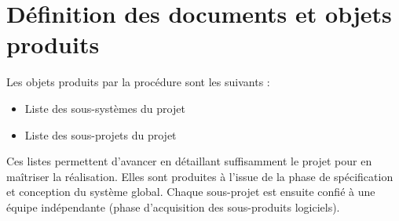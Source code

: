 \section{Définition des documents et objets produits}

Les objets produits par la procédure sont les suivants :

\begin{itemize}
\item Liste des sous-systèmes du projet
\item Liste des sous-projets du projet
\end{itemize}

Ces listes permettent d'avancer en détaillant suffisamment le projet pour en maîtriser
la réalisation. Elles sont produites à l'issue de la phase de spécification
et conception du système global. Chaque sous-projet est ensuite confié à
une équipe indépendante (phase d'acquisition des sous-produits logiciels).

\vfill
\pagebreak
